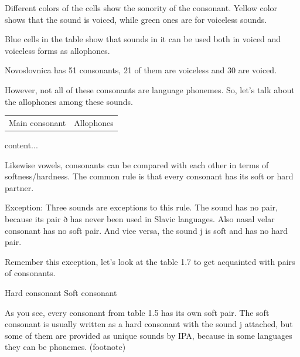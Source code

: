 Different colors of the cells show the sonority of the consonant. Yellow color shows that the sound is voiced, while green ones are for voiceless sounds.

Blue cells in the table show that sounds in it can be used both in voiced and voiceless forms as allophones.

Novoslovnica has 51 consonants, 21 of them are voiceless and 30 are voiced.

However, not all of these consonants are language phonemes. So, let’s talk about the allophones among these sounds.

\begin{table}
	\begin{tabular}{ll}
		Main consonant & Allophones \\
	\end{tabular}
	content...
\end{table}



Likewise vowels, consonants can be compared with each other in terms of softness/hardness. The common rule is that every consonant has its soft or hard partner.

Exception: Three sounds are exceptions to this rule.
The sound  has no pair, because its pair ð has never been used in Slavic languages.
Also nasal velar consonant  has no soft pair.
And vice versa, the sound j is soft and has no hard pair. 

Remember this exception, let’s look at the table 1.7 to get acquainted with pairs of consonants.


Hard consonant
Soft consonant


As you see, every consonant from table 1.5 has its own soft pair. The soft consonant is usually written as a hard consonant with the sound j attached, but some of them are provided as unique sounds by IPA, because in some languages they can be phonemes. (footnote)


